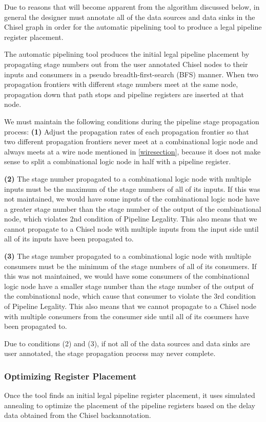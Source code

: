 Due to reasons that will become apparent from the algorithm discussed below, in general the designer must annotate all of the data sources and data sinks in the Chisel graph in order for the automatic pipelining tool to produce a legal pipeline register placement.

The automatic pipelining tool produces the initial legal pipeline placement by propagating stage numbers out from the user annotated Chisel nodes to their inputs and consumers in a pseudo breadth-first-search (BFS) manner. When two propagation frontiers with different stage numbers meet at the same node, propagation down that path stops and pipeline registers are inserted at that node.

We must maintain the following conditions during the pipeline stage propagation process:
{\bf (1)} Adjust the propagation rates of each propagation frontier so that two different propagation frontiers never meet at a combinational logic node and always meets at a wire node mentioned in \ref{wiresection}, because it does not make sense to split a combinational logic node in half with a pipeline register.

{\bf (2)}  The stage number propagated to a combinational logic node with multiple inputs must be the maximum of the stage numbers of all of its inputs. If this was not maintained, we would have some inputs of the combinational logic node have a greater stage number than the stage number of the output of the combinational node, which violates 2nd condition of Pipeline Legality. This also means that we cannot propagate to a Chisel node with multiple inputs from the input side until all of its inputs have been propagated to.

{\bf (3)} The stage number propagated to a combinational logic node with multiple consumers must be the minimum of the stage numbers of all of its consumers. If this was not maintained, we would have some consumers of the combinational logic node have a smaller stage number than the stage number of the output of the combinational node, which cause that consumer to violate the 3rd condition of Pipeline Legality. This also means that we cannot propagate to a Chisel node with multiple consumers from the consumer side until all of its cosumers have been propagated to.

Due to conditions (2) and (3), if not all of the data sources and data sinks are user annotated, the stage propagation process may never complete.

\subsubsection{Optimizing Register Placement}
Once the tool finds an initial legal pipeline register placement, it uses simulated annealing to optimize the placement of the pipeline registers based on the delay data obtained from the Chisel backannotation.

